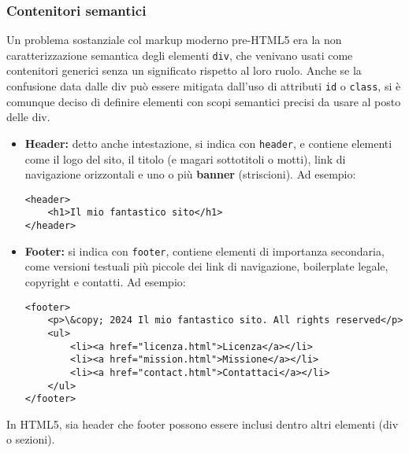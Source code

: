 \documentclass[a4paper,11pt]{article}
\begin{document}
\subsubsection{Contenitori semantici}
Un problema sostanziale col markup moderno pre-HTML5 era la non caratterizzazione semantica degli elementi \lstinline|div|, che venivano usati come contenitori generici senza un significato rispetto al loro ruolo.
Anche se la confusione data dalle div può essere mitigata dall'uso di attributi \lstinline|id| o \lstinline|class|, si è comunque deciso di definire elementi con scopi semantici precisi da usare al posto delle div.

\begin{itemize}
	\item \textbf{Header:} detto anche intestazione, si indica con \lstinline|header|, e contiene elementi come il logo del sito, il titolo (e magari sottotitoli o motti), link di navigazione orizzontali e uno o più \textbf{banner} (striscioni). Ad esempio:
\begin{lstlisting}
<header>
	<h1>Il mio fantastico sito</h1>
</header>
\end{lstlisting}

	\item \textbf{Footer:} si indica con \lstinline|footer|, contiene elementi di importanza secondaria, come versioni testuali più piccole dei link di navigazione, boilerplate legale, copyright e contatti. Ad esempio:
\begin{lstlisting}	
<footer>
	<p>\&copy; 2024 Il mio fantastico sito. All rights reserved</p>
	<ul>
		<li><a href="licenza.html">Licenza</a></li>
		<li><a href="mission.html">Missione</a></li>
		<li><a href="contact.html">Contattaci</a></li>
	</ul>
</footer>
\end{lstlisting}

\end{itemize}
In HTML5, sia header che footer possono essere inclusi dentro altri elementi (div o sezioni).
\end{document}
